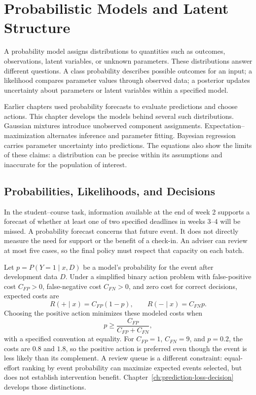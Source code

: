 \begingroup
\raggedbottom
{}
\chapter{Probabilistic Models and Latent Structure}
\label{ch:probabilistic-models}

A probability model assigns distributions to quantities such as outcomes, observations, latent variables, or unknown parameters. These distributions answer different questions. A class probability describes possible outcomes for an input; a likelihood compares parameter values through observed data; a posterior updates uncertainty about parameters or latent variables within a specified model.

Earlier chapters used probability forecasts to evaluate predictions and choose actions. This chapter develops the models behind several such distributions. Gaussian mixtures introduce unobserved component assignments. Expectation--maximization alternates inference and parameter fitting. Bayesian regression carries parameter uncertainty into predictions. The equations also show the limits of these claims: a distribution can be precise within its assumptions and inaccurate for the population of interest.

\section{Probabilities, Likelihoods, and Decisions}

In the student--course task, information available at the end of week 2 supports a forecast of whether at least one of two specified deadlines in weeks 3--4 will be missed. A probability forecast concerns that future event. It does not directly measure the need for support or the benefit of a check-in. An adviser can review at most five cases, so the final policy must respect that capacity on each batch.

Let $p=P(Y=1\mid x,D)$ be a model's probability for the event after development data $D$. Under a simplified binary action problem with false-positive cost $C_{FP}>0$, false-negative cost $C_{FN}>0$, and zero cost for correct decisions, expected costs are
\[
R(+\mid x)=C_{FP}(1-p),\qquad R(-\mid x)=C_{FN}p.
\]
Choosing the positive action minimizes these modeled costs when
\[
p\ge\frac{C_{FP}}{C_{FP}+C_{FN}},
\]
with a specified convention at equality. For $C_{FP}=1$, $C_{FN}=9$, and $p=0.2$, the costs are $0.8$ and $1.8$, so the positive action is preferred even though the event is less likely than its complement. A review queue is a different constraint: equal-effort ranking by event probability can maximize expected events selected, but does not establish intervention benefit. Chapter~\ref{ch:prediction-loss-decision} develops those distinctions.

